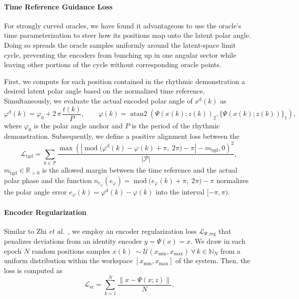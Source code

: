 \paragraph{Time Reference Guidance Loss}
For strongly curved oracles, we have found it advantageous to use the oracle’s time parameterization to steer how its positions map onto the latent polar angle. Doing so spreads the oracle samples uniformly around the latent-space limit cycle, preventing the encoders from bunching up in one angular sector while leaving other portions of the cycle without corresponding oracle points.

First, we compute for each position contained in the rhythmic demonstration a desired latent polar angle based on the normalized time reference. Simultaneously, we evaluate the actual encoded polar angle of $x^\mathrm{d}(k)$ as
\begin{equation}
     \varphi^\mathrm{d}(k) = \varphi_0 + 2 \, \pi \, \frac{t(k)}{P},
     \qquad
     \varphi(k) = \operatorname{atan2}\left ( \Psi(x(k);z(k))_2, \{ \Psi(x(k);z(k)) \}_1 \right),
\end{equation}
where $\varphi_0$ is the polar angle anchor and $P$ is the period of the rhythmic demonstration.
Subsequently, we define a positive alignment loss between the 
\begin{equation}
    \mathcal{L}_\mathrm{tgd} = \sum_{k \in \mathcal{P}} \frac{\max \left ( \left | \operatorname{mod} \bigl( \varphi^\mathrm{d}(k) - \varphi(k) + \pi,\; 2\pi\bigr) - \pi \right | - m_\mathrm{tgd}, 0 \right )^2}{|\mathcal{P}|},
\end{equation}
$m_\mathrm{tgd} \in \mathbb{R}_{>0}$ is the allowed margin between the time reference and the actual polar phase and the function $n_{e_\varphi}(e_\varphi) = \operatorname{mod} \bigl( e_\varphi(k) + \pi,\; 2\pi\bigr) - \pi$ normalizes the polar angle error $e_\varphi(k) = \varphi^\mathrm{d}(k) - \varphi(k) $ into the interval $[-\pi, \pi)$.

\paragraph{Encoder Regularization}
Similar to Zhi \textit{et al.}~\citep{zhi2024teaching}, we employ an encoder regularization loss $\mathcal{L}_{\Psi, \mathrm{reg}}$ that penalizes deviations from an identity encoder $y = \Psi(x) = x$.
We draw in each epoch $N$ random positions samples $x(k) ~\sim \mathcal{U}(x_\mathrm{min}, x_\mathrm{max}) \: \forall \, k \in \mathbb{N}_N$ from a uniform distribution within the workspace $[x_\mathrm{min}, x_\mathrm{max}]$ of the system. Then, the loss is computed as
\begin{equation}
    \mathcal{L}_{\mathrm{er}} = \sum_{k=1}^{N} \frac{\lVert x - \Psi(x;z) \rVert}{N}.
\end{equation}


